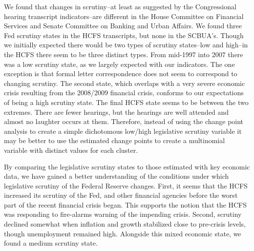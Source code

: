 \documentclass[a4paper]{article}\usepackage[]{graphicx}\usepackage[]{color}
\begin{document}
We found that changes in scrutiny--at least as suggested by the Congressional hearing transcript indicators--are different in the House Committee on Financial Services and Senate Committee on Banking and Urban Affairs. We found three Fed scrutiny states in the HCFS transcripts, but none in the SCBUA's. Though we initially expected there would be two types of scrutiny states--low and high--in the HCFS there seem to be three distinct types. From mid-1997 into 2007 there was a low scrutiny state, as we largely expected with our indicators. The one exception is that formal letter correspondence does not seem to correspond to changing scrutiny. The second state, which overlaps with a very severe economic crisis resulting from the 2008/2009 financial crisis, conforms to our expectations of being a high scrutiny state. The final HCFS state seems to be between the two extremes. There are fewer hearings, but the hearings are well attended and almost no laughter occurs at them. Therefore, instead of using the change point analysis to create a simple dichotomous low/high legislative scrutiny variable it may be better to use the estimated change points to create a multinomial variable with distinct values for each cluster.

By comparing the legislative scrutiny states to those estimated with key economic data, we have gained a better understanding of the conditions under which legislative scrutiny of the Federal Reserve changes. First, it seems that the HCFS increased its scrutiny of the Fed, and other financial agencies before the worst part of the recent financial crisis began. This supports the notion that the HCFS was responding to fire-alarms warning of the impending crisis. Second, scrutiny declined somewhat when inflation and growth stabilized close to pre-crisis levels, though unemployment remained high. Alongside this mixed economic state, we found a medium scrutiny state.




\end{document}
